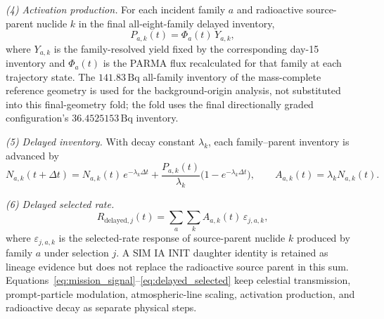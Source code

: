 \documentclass[11pt]{article}
\begin{document}
\emph{(4) Activation production.} For each incident family $a$ and radioactive
source-parent nuclide $k$ in the final all-eight-family delayed inventory,
\begin{equation}
  P_{a,k}(t)=\Phi_{a}(t)\,Y_{a,k},
  \label{eq:activation_production}
\end{equation}
where $Y_{a,k}$ is the family-resolved yield fixed by the corresponding day-15
inventory and $\Phi_a(t)$ is the PARMA flux recalculated for that family at each
trajectory state. The $141.83\,\mathrm{Bq}$
all-family inventory of the mass-complete reference geometry is used for the
background-origin analysis, not substituted into this final-geometry fold; the
fold uses the final directionally graded configuration's
$36.4525153\,\mathrm{Bq}$ inventory.

\emph{(5) Delayed inventory.} With decay constant $\lambda_k$, each family--parent
inventory is advanced by
\begin{equation}
  N_{a,k}(t+\Delta t)=N_{a,k}(t)\,e^{-\lambda_k\Delta t}
  +\frac{P_{a,k}(t)}{\lambda_k}\bigl(1-e^{-\lambda_k\Delta t}\bigr),
  \qquad A_{a,k}(t)=\lambda_k N_{a,k}(t).
  \label{eq:delayed_inventory}
\end{equation}

\emph{(6) Delayed selected rate.}
\begin{equation}
  R_{\mathrm{delayed},j}(t)=\sum_{a}\sum_{k} A_{a,k}(t)\,\varepsilon_{j,a,k},
  \label{eq:delayed_selected}
\end{equation}
where $\varepsilon_{j,a,k}$ is the selected-rate response of source-parent
nuclide $k$ produced by family $a$ under selection $j$. A SIM IA INIT daughter
identity is retained as lineage evidence but does not replace the radioactive
source parent in this sum. Equations~\eqref{eq:mission_signal}--\eqref{eq:delayed_selected}
keep celestial transmission, prompt-particle modulation, atmospheric-line scaling,
activation production, and radioactive decay as separate physical steps.
\end{document}
